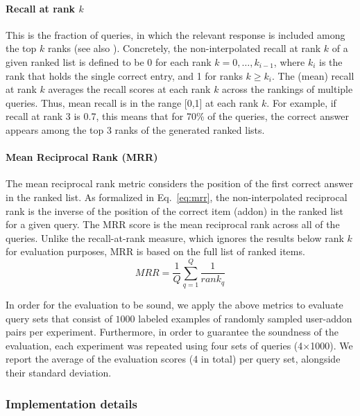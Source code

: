 \documentclass[ijoc,nonblindrev]{informs3} %
\numberwithin{equation}{subsection}
\begin{document}
\paragraph{Recall at rank $k$}
This is the fraction of queries, in which the relevant response is included among the top $k$ ranks (see also \cite{minkov2010improving}). Concretely, the non-interpolated recall at rank $k$ of a given ranked list is defined to be 0 for each rank $k = 0, \dots, k_{i-1}$, where $k_i$ is the rank that holds the single correct entry, and 1 for ranks $k\geq k_i$. The (mean) recall at rank $k$ averages the recall scores at each rank $k$ across the rankings of multiple queries. Thus, mean recall is in the range [0,1] at each rank $k$. For example, if recall at rank 3 is 0.7, this means that for 70\% of the queries, the correct answer appears among the top 3 ranks of the generated ranked lists.

\paragraph{Mean Reciprocal Rank (MRR)}

The mean reciprocal rank metric \citep{voorhees1999trec} considers the position of the first correct answer in the ranked list.  As formalized in Eq.~\eqref{eq:mrr}, the non-interpolated reciprocal rank is the inverse of the position of the correct item (addon) in the ranked list for a given query. The MRR score is the mean reciprocal rank across all of the queries. Unlike the recall-at-rank measure, which ignores the results below rank $k$ for evaluation purposes, MRR is based on the full list of ranked items. 
\begin{equation}
 MRR = \frac{1}{Q} \displaystyle\sum\limits_{q=1}^{Q} \frac{1}{rank_q}
\label{eq:mrr}
\end{equation}

In order for the evaluation to be sound, we apply the above metrics to evaluate query sets that consist of $1000$ labeled examples of randomly sampled user-addon pairs per experiment. Furthermore, in order to guarantee the soundness of the evaluation, each experiment was repeated using four sets of queries (4$\times$1000). We report the average of the evaluation scores (4 in total) per query set, alongside their standard deviation.  

\subsubsection{Implementation details}
\end{document}
